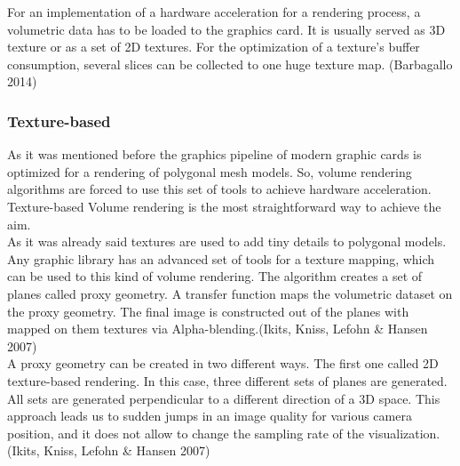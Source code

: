 \documentclass[twoside, english, 11pt]{report}
\begin{document}
For an implementation of a hardware acceleration for a rendering process, a volumetric data has to be loaded to the graphics card. It is usually served as 3D texture or as a set of 2D textures. For the optimization of a texture's buffer consumption, several slices can be collected to one huge texture map. (Barbagallo 2014) 

\subsubsection{Texture-based}

As it was mentioned before the graphics pipeline of modern graphic cards is optimized for a rendering of polygonal mesh models. So, volume rendering algorithms are forced to use this set of tools to achieve hardware acceleration. Texture-based Volume rendering is the most straightforward way to achieve the aim.\\

As it was already said textures are used to add tiny details to polygonal models. Any graphic library has an advanced set of tools for a texture mapping, which can be used to this kind of volume rendering. The algorithm creates a set of planes called proxy geometry. A transfer function maps the volumetric dataset on the proxy geometry. The final image is constructed out of the planes with mapped on them textures via Alpha-blending.(Ikits, Kniss, Lefohn \& Hansen 2007)\\

A proxy geometry can be created in two different ways. The first one called 2D texture-based rendering. In this case, three different sets of planes are generated. All sets are generated perpendicular to a different direction of a 3D space. This approach leads us to sudden jumps in an image quality for various camera position, and it does not allow to change the sampling rate of the visualization.(Ikits, Kniss, Lefohn \& Hansen 2007)\\
\end{document}
